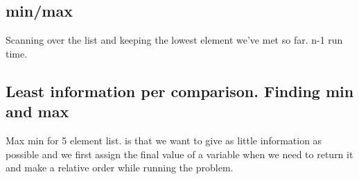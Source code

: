 \documentclass[a4paper,10pt,titlepage]{report}
\begin{document}
\subsection{min/max}

Scanning over the list and keeping the lowest element we've met so far. n-1 run time.\\

\subsection{Least information per comparison. Finding min and max}

Max min for 5 element list. is that we want to give as little information as possible and we first assign the final value of a variable when we need to return it and make a relative order while running the problem.\\
\end{document}
